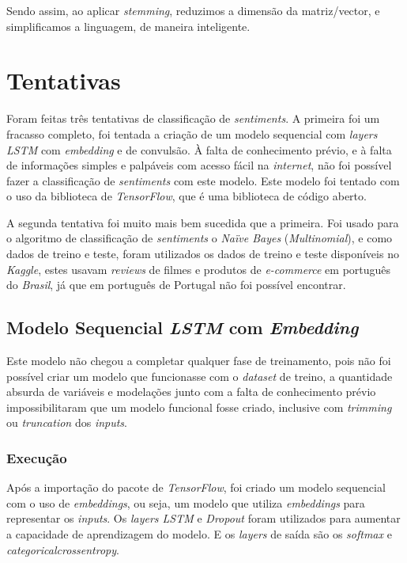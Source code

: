 Sendo assim, ao aplicar \textit{stemming}, reduzimos a dimensão da matriz/vector, e simplificamos a linguagem, de maneira inteligente.

\section{Tentativas}

Foram feitas três tentativas de classificação de \textit{sentiments}. A primeira foi um fracasso completo, foi tentada a criação de um modelo sequencial com \textit{layers LSTM} com \textit{embedding} e de convulsão. À falta de conhecimento prévio, e à falta de informações simples e palpáveis com acesso fácil na \textit{internet}, não foi possível fazer a classificação de \textit{sentiments} com este modelo. Este modelo foi tentado com o uso da biblioteca de \textit{TensorFlow}, que é uma biblioteca de código aberto.

A segunda tentativa foi muito mais bem sucedida que a primeira. Foi usado para o algoritmo de classificação de \textit{sentiments} o \textit{Naïve Bayes} (\textit{Multinomial}), e como dados de treino e teste, foram utilizados os dados de treino e teste disponíveis no \textit{Kaggle}, estes usavam \textit{reviews} de filmes e produtos de \textit{e-commerce} em português do \textit{Brasil}, já que em português de Portugal não foi possível encontrar.

\subsection{Modelo Sequencial \textit{LSTM} com \textit{Embedding}}

Este modelo não chegou a completar qualquer fase de treinamento, pois não foi possível criar um modelo que funcionasse com o \textit{dataset} de treino, a quantidade absurda de variáveis e modelações junto com a falta de conhecimento prévio impossibilitaram que um modelo funcional fosse criado, inclusive com \textit{trimming} ou \textit{truncation} dos \textit{inputs}.

\subsubsection{Execução}

Após a importação do pacote de \textit{TensorFlow}, foi criado um modelo sequencial com o uso de \textit{embeddings}, ou seja, um modelo que utiliza \textit{embeddings} para representar os \textit{inputs}. Os \textit{layers LSTM} e \textit{Dropout} foram utilizados para aumentar a capacidade de aprendizagem do modelo. E os \textit{layers} de saída são os \textit{softmax} e \textit{categorical\textunderscore crossentropy}.

